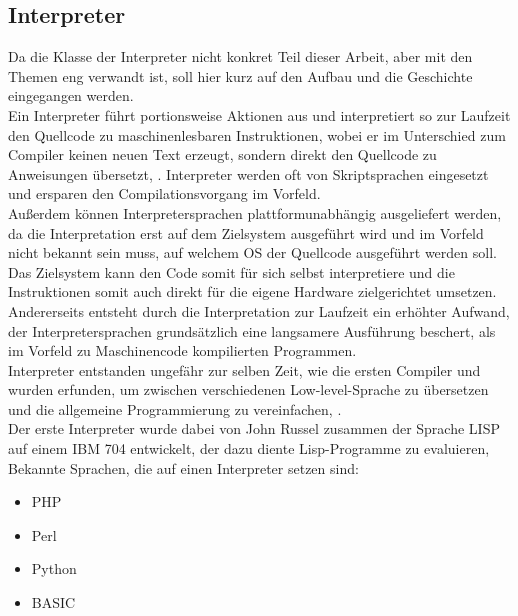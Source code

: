\subsection{Interpreter} \label{ch_interpreter}
Da die Klasse der Interpreter nicht konkret Teil dieser Arbeit, aber mit den Themen eng verwandt ist, soll hier kurz auf den Aufbau und die Geschichte eingegangen werden. \\
Ein Interpreter führt portionsweise Aktionen aus und interpretiert so zur Laufzeit den Quellcode zu maschinenlesbaren Instruktionen, wobei er im Unterschied zum Compiler keinen neuen Text erzeugt, sondern direkt den Quellcode zu Anweisungen übersetzt, \cite[vgl. Wagenknecht Hielscher 2022, S.4]{wagenknecht_hielscher_2022}. Interpreter werden oft von Skriptsprachen eingesetzt und ersparen den Compilationsvorgang im Vorfeld. \\
Außerdem können Interpretersprachen plattformunabhängig ausgeliefert werden, da die Interpretation erst auf dem Zielsystem ausgeführt wird und im Vorfeld nicht bekannt sein muss, auf welchem \ac{OS} der Quellcode ausgeführt werden soll. Das Zielsystem kann den Code somit für sich selbst interpretiere und die Instruktionen somit auch direkt für die eigene Hardware zielgerichtet umsetzen. \\
Andererseits entsteht durch die Interpretation zur Laufzeit ein erhöhter Aufwand, der Interpretersprachen grundsätzlich eine langsamere Ausführung beschert, als im Vorfeld zu Maschinencode kompilierten Programmen.\\
Interpreter entstanden ungefähr zur selben Zeit, wie die ersten Compiler und wurden erfunden, um zwischen verschiedenen Low-level-Sprache zu übersetzen und die allgemeine Programmierung zu vereinfachen, \cite[vgl. Bennet 1952, S.81 f]{Bennett1952}. \\
Der erste Interpreter wurde dabei von John Russel zusammen der Sprache LISP auf einem IBM 704 entwickelt, der dazu diente Lisp-Programme zu evaluieren, \cite[vgl. Stoyan S.299ff]{Stoyan1984}\\
Bekannte Sprachen, die auf einen Interpreter setzen sind: 
\begin{itemize}
    \item PHP
    \item Perl
    \item Python
    \item BASIC
\end{itemize}


